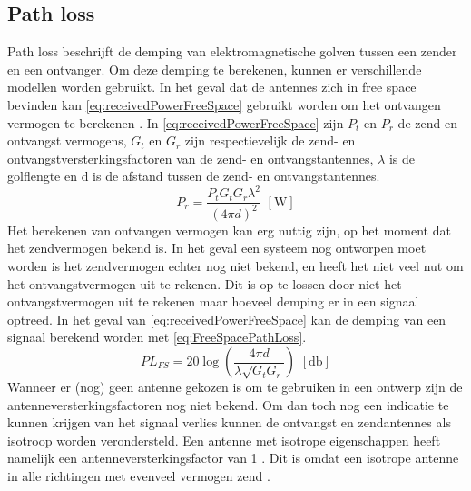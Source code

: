 \subsection{Path loss}
Path loss beschrijft de demping van elektromagnetische golven tussen een zender en een ontvanger. Om deze demping te berekenen, kunnen er verschillende modellen worden gebruikt. In het geval dat de antennes zich in free space bevinden kan \cref{eq:receivedPowerFreeSpace} gebruikt worden om het ontvangen vermogen te berekenen \cite[13]{bensky2019shortRangeWirelessCommunication}. In \cref{eq:receivedPowerFreeSpace} zijn \(P_t\) en \(P_r\) de zend en ontvangst vermogens, \(G_t\) en \(G_r\) zijn respectievelijk de zend- en ontvangstversterkingsfactoren van de zend- en ontvangstantennes, \(\lambda\) is de golflengte en d is de afstand tussen de zend- en ontvangstantennes. 
\begin{equation}\label{eq:receivedPowerFreeSpace}
    P_r=\frac{P_tG_tG_r\lambda^2}{\left(4\pi d\right)^2} \,\,\left[\unit{\watt}\right]
\end{equation}
Het berekenen van ontvangen vermogen kan erg nuttig zijn, op het moment dat het zendvermogen bekend is. In het geval een systeem nog ontworpen moet worden is het zendvermogen echter nog niet bekend, en heeft het niet veel nut om het ontvangstvermogen uit te rekenen. Dit is op te lossen door niet het ontvangstvermogen uit te rekenen maar hoeveel demping er in een signaal optreed. In het geval van \cref{eq:receivedPowerFreeSpace} kan de demping van een signaal berekend worden met \cref{eq:FreeSpacePathLoss}.
\begin{equation}\label{eq:FreeSpacePathLoss}
    PL_{FS}=20\log\left(\frac{4\pi d}{\lambda\sqrt{G_tG_r}}\right) \,\,\left[\unit{\decibel}\right]
\end{equation}
Wanneer er (nog) geen antenne gekozen is om te gebruiken in een ontwerp zijn de antenneversterkingsfactoren nog niet bekend. Om dan toch nog een indicatie te kunnen krijgen van het signaal verlies kunnen de ontvangst en zendantennes als isotroop worden verondersteld. Een antenne met isotrope eigenschappen heeft namelijk een antenneversterkingsfactor van 1 \cite{bensky2019shortRangeWirelessCommunication}. Dit is omdat een isotrope antenne in alle richtingen met evenveel vermogen zend \cite{bensky2019shortRangeWirelessCommunication}.
